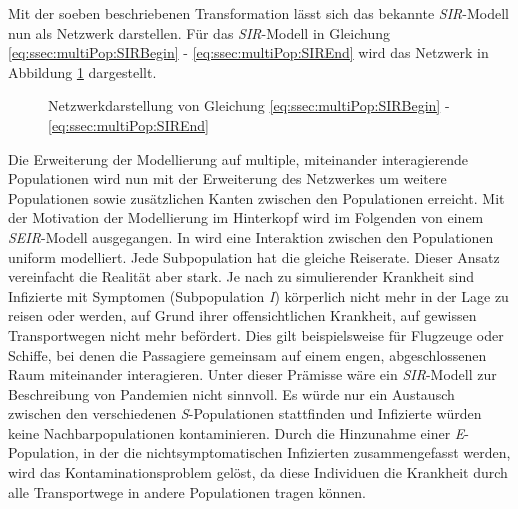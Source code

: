 Mit der soeben beschriebenen Transformation lässt sich das bekannte \emph{SIR}-Modell nun als Netzwerk darstellen. Für das \emph{SIR}-Modell in Gleichung \ref{eq:ssec:multiPop:SIRBegin} - \ref{eq:ssec:multiPop:SIREnd} wird das Netzwerk in Abbildung \ref{fig:ssec:multiPop:SIRNet} dargestellt.

\begin{figure}
\begin{center}
\end{center}
\caption{Netzwerkdarstellung von Gleichung \ref{eq:ssec:multiPop:SIRBegin} - \ref{eq:ssec:multiPop:SIREnd}}\label{fig:ssec:multiPop:SIRNet}
\end{figure}

Die Erweiterung der Modellierung auf multiple, miteinander interagierende Populationen wird nun mit der Erweiterung des Netzwerkes um weitere Populationen sowie zusätzlichen Kanten zwischen den Populationen erreicht. Mit der Motivation der Modellierung im Hinterkopf wird im Folgenden von einem \emph{SEIR}-Modell ausgegangen. In \cite{Sattenspiel1995} wird eine Interaktion zwischen den Populationen uniform modelliert. Jede Subpopulation hat die gleiche Reiserate. Dieser Ansatz vereinfacht die Realität aber stark. Je nach zu simulierender Krankheit sind Infizierte mit Symptomen (Subpopulation \emph{I}) körperlich nicht mehr in der Lage zu reisen oder werden, auf Grund ihrer offensichtlichen Krankheit, auf gewissen Transportwegen nicht mehr befördert. Dies gilt beispielsweise für Flugzeuge oder Schiffe, bei denen die Passagiere gemeinsam auf einem engen, abgeschlossenen Raum miteinander interagieren. Unter dieser Prämisse wäre ein \emph{SIR}-Modell zur Beschreibung von Pandemien nicht sinnvoll. Es würde nur ein Austausch zwischen den verschiedenen \emph{S}-Populationen stattfinden und Infizierte würden keine Nachbarpopulationen kontaminieren.  Durch die Hinzunahme einer \emph{E}-Population, in der die nichtsymptomatischen Infizierten zusammengefasst werden, wird das Kontaminationsproblem gelöst, da diese Individuen die Krankheit durch alle Transportwege in andere Populationen tragen können. 

